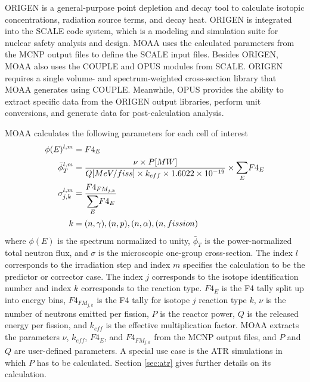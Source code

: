 ORIGEN is a general-purpose point depletion and decay tool to calculate isotopic concentrations, radiation source terms, and decay heat.
ORIGEN is integrated into the SCALE code system, which is a modeling and simulation suite for nuclear safety analysis and design.
MOAA uses the calculated parameters from the MCNP output files to define the SCALE input files.
Besides ORIGEN, MOAA also uses the COUPLE and OPUS modules from SCALE.
ORIGEN requires a single volume- and spectrum-weighted cross-section library that MOAA generates using COUPLE.
Meanwhile, OPUS provides the ability to extract specific data from the ORIGEN output libraries, perform unit conversions, and generate data for post-calculation analysis.

MOAA calculates the following parameters for each cell of interest
\begin{align}
\phi(E)^{l, m} &= F4_{E} \\
\bar{\phi}_T^{l, m} &= \frac{\nu \times P [MW]}{Q [MeV/fiss] \times k_{eff} \times 1.6022 \times 10^{-19}} \times \mathlarger{\sum}_E F4_E \label{eq-flux} \\
\sigma_{j,k}^{l, m} &= \frac{ F4_{FM_{j,k}} }{ \mathlarger{\sum}_E F4_E } \\  %
k &= (n,\gamma), (n,p), (n,\alpha), (n,fission)
\end{align}
where $\phi(E)$ is the spectrum normalized to unity, $\bar{\phi}_T$ is the power-normalized total neutron flux, and $\sigma$ is the microscopic one-group cross-section.
The index $l$ corresponds to the irradiation step and index $m$ specifies the calculation to be the predictor or corrector case.
The index $j$ corresponds to the isotope identification number and index $k$ corresponds to the reaction type.
$F4_E$ is the F4 tally split up into energy bins, $F4_{FM_{j,k}}$ is the F4 tally for isotope $j$ reaction type $k$, $\nu$ is the number of neutrons emitted per fission, $P$ is the reactor power, $Q$ is the released energy per fission, and $k_{eff}$ is the effective multiplication factor.
MOAA extracts the parameters $\nu$, $k_{eff}$, $F4_E$, and $F4_{FM_{j,k}}$ from the MCNP output files, and $P$ and $Q$ are user-defined parameters.
A special use case is the ATR simulations in which $P$ has to be calculated.
Section \ref{sec:atr} gives further details on its calculation.

